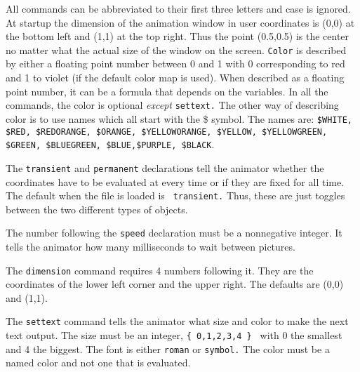 \documentclass{article}
\begin{document}
All commands can be abbreviated to their first three letters and case
is ignored. At startup the dimension of the animation window in user
coordinates is (0,0) at the bottom left and (1,1) at the top
right. Thus the point (0.5,0.5) is the center no matter what the
actual size of the window on the screen.  {\tt Color} is described by either
a floating point number between 0 and 1 with 0 corresponding to red
and 1 to violet (if the default color map is used). When described as a floating point number, it can be
a formula that depends on the variables. In all the commands, the
color is optional {\em except} {\tt settext.}  The other way of
describing color is to use names which all start with the \$
symbol. The names are:
{\tt \$WHITE, \$RED, \$REDORANGE, \$ORANGE, \$YELLOWORANGE,
                    \$YELLOW, \$YELLOWGREEN, \$GREEN, \$BLUEGREEN,
		      \$BLUE,\$PURPLE, \$BLACK}.

The {\tt transient} and {\tt permanent} declarations tell the animator
whether the coordinates have to be evaluated at every time or if they
are fixed for all time.  The default when the file is loaded is {\tt
transient.}  Thus, these are just toggles between the two different
types of objects. 

The number following the {\tt speed} declaration must be a nonnegative
integer. It tells the animator how many milliseconds to wait between
pictures. 

The {\tt dimension} command requires 4 numbers following it. They are
the coordinates of the lower left corner and the upper right. The
defaults are (0,0) and (1,1).  

The {\tt settext} command tells the animator what size and color to
make the next text output. The size must be an integer, {\tt \{
0,1,2,3,4 \} } with 0 the smallest and 4 the biggest. The font is
either {\tt roman} or {\tt symbol.}  The color must be a named color
and not one that is evaluated. 
\end{document}
